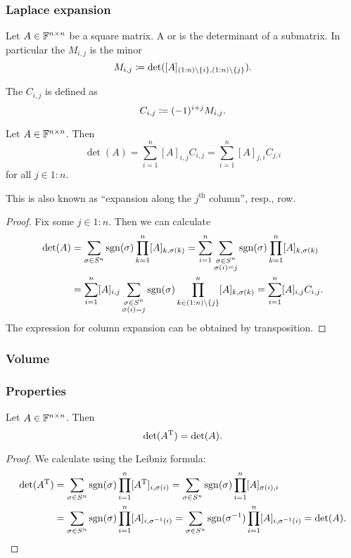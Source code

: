 \subsubsection{Laplace expansion}
\begin{definition}
Let $A\in\mathbb{F}^{n\times n}$ be a square matrix. A  or  is the determinant of a submatrix. In particular the  $M_{i,j}$ is the minor
\[ M_{i,j} \coloneqq \det([A]_{(1:n)\setminus\{i\},(1:n)\setminus\{j\}}). \]

The  $C_{i,j}$ is defined as
\[ C_{i,j} \coloneqq (-1)^{i+j}M_{i,j}. \]
\end{definition}
\begin{proposition} \label{LaplaceExpansion}
Let $A\in\mathbb{F}^{n\times n}$. Then
\[ \det(A) = \sum_{i=1}^n [A]_{i,j}C_{i,j} = \sum_{i=1}^n [A]_{j,i}C_{j,i} \]
for all $j\in 1:n$.
\end{proposition}
This is also known as ``expansion along the $j^\text{th}$ column'', resp., row.
\begin{proof}
Fix some $j\in 1:n$. Then we can calculate
\begin{align*}
\det(A) &=  \sum_{\sigma\in S^n}\operatorname{sgn}(\sigma)\prod_{k=1}^n[A]_{k,\sigma(k)} = \sum_{i=1}^n\sum_{\substack{\sigma\in S^n \\ \sigma(i)=j}}\operatorname{sgn}(\sigma)\prod_{k=1}^n[A]_{k,\sigma(k)} \\
&= \sum_{i=1}^n [A]_{i,j}\sum_{\substack{\sigma\in S^n \\ \sigma(i)=j}}\operatorname{sgn}(\sigma)\prod_{k\in (1:n)\setminus\{j\}}^n[A]_{k,\sigma(k)} = \sum_{i=1}^n [A]_{i,j}C_{i,j}.
\end{align*}
The expression for column expansion can be obtained by transposition.
\end{proof}

\subsubsection{Volume}

\subsubsection{Properties}
\begin{lemma}
Let $A\in\mathbb{F}^{n\times n}$. Then
\[ \det(A^{\mathrm{T}}) = \det(A). \]
\end{lemma}
\begin{proof}
We calculate using the Leibniz formula:
\begin{align*}
\det(A^{\mathrm{T}}) &= \sum_{\sigma\in S^n}\operatorname{sgn}(\sigma)\prod_{i=1}^n[A^{\mathrm{T}}]_{i,\sigma(i)} = \sum_{\sigma\in S^n}\operatorname{sgn}(\sigma)\prod_{i=1}^n[A]_{\sigma(i),i} \\
&= \sum_{\sigma\in S^n}\operatorname{sgn}(\sigma)\prod_{i=1}^n[A]_{i,\sigma^{-1}(i)} = \sum_{\sigma\in S^n}\operatorname{sgn}(\sigma^{-1})\prod_{i=1}^n[A]_{i,\sigma^{-1}(i)} = \det(A).
\end{align*}
\end{proof}

